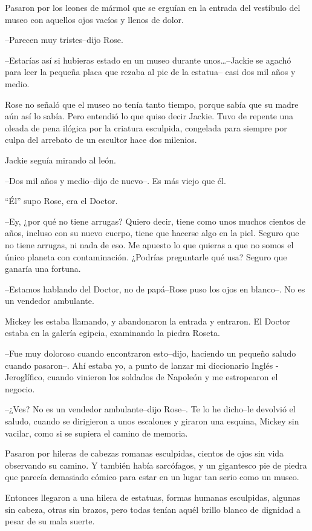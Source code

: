 Pasaron por los leones de mármol que se erguían en la entrada del
vestíbulo del museo con aquellos ojos vacíos y llenos de dolor.

--Parecen muy tristes--dijo Rose.

--Estarías así si hubieras estado en un museo durante
unos\ldots{}--Jackie se agachó para leer la pequeña placa que rezaba al
pie de la estatua-- casi dos mil años y medio.

Rose no señaló que el museo no tenía tanto tiempo, porque sabía que su
madre aún así lo sabía. Pero entendió lo que quiso decir Jackie. Tuvo de
repente una oleada de pena ilógica por la criatura esculpida, congelada
para siempre por culpa del arrebato de un escultor hace dos milenios.

Jackie seguía mirando al león.

--Dos mil años y medio--dijo de nuevo--. Es más viejo que él.

``Él'' supo Rose, era el Doctor.

--Ey, ¿por qué no tiene arrugas? Quiero decir, tiene como unos muchos
cientos de años, incluso con su nuevo cuerpo, tiene que hacerse algo en
la piel. Seguro que no tiene arrugas, ni nada de eso. Me apuesto lo que
quieras a que no somos el único planeta con contaminación. ¿Podrías
preguntarle qué usa? Seguro que ganaría una fortuna.

--Estamos hablando del Doctor, no de papá--Rose puso los ojos en
blanco--. No es un vendedor ambulante.

Mickey les estaba llamando, y abandonaron la entrada y entraron. El
Doctor estaba en la galería egipcia, examinando la piedra Roseta.

--Fue muy doloroso cuando encontraron esto--dijo, haciendo un pequeño
saludo cuando pasaron--. Ahí estaba yo, a punto de lanzar mi diccionario
Inglés - Jeroglífico, cuando vinieron los soldados de Napoleón y me
estropearon el negocio.

--¿Ves? No es un vendedor ambulante--dijo Rose--. Te lo he dicho--le
devolvió el saludo, cuando se dirigieron a unos escalones y giraron una
esquina, Mickey sin vacilar, como si se supiera el camino de memoria.

Pasaron por hileras de cabezas romanas esculpidas, cientos de ojos sin
vida observando su camino. Y también había sarcófagos, y un gigantesco
pie de piedra que parecía demasiado cómico para estar en un lugar tan
serio como un museo.

Entonces llegaron a una hilera de estatuas, formas humanas esculpidas,
algunas sin cabeza, otras sin brazos, pero todas tenían aquél brillo
blanco de dignidad a pesar de su mala suerte.


